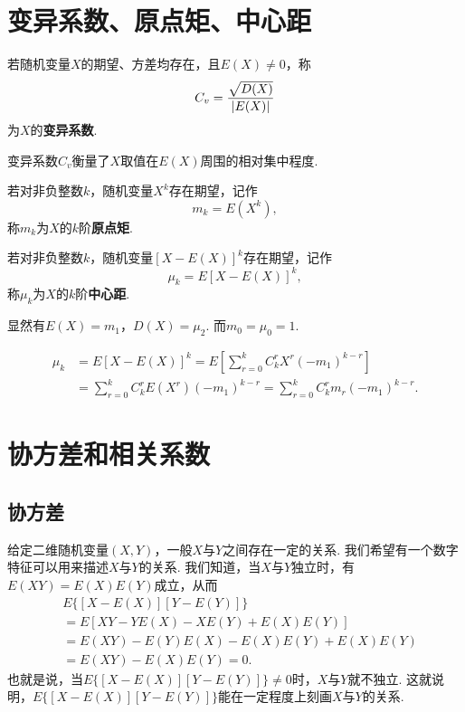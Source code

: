 \section{变异系数、原点矩、中心距}
\begin{definition}
若随机变量\(X\)的期望、方差均存在，且\(E(X) \neq 0\)，称\[
C_v = \frac{\sqrt{D(X)}}{\abs{E(X)}}
\]为\(X\)的\textbf{变异系数}.

变异系数\(C_v\)衡量了\(X\)取值在\(E(X)\)周围的相对集中程度.
\end{definition}

\begin{definition}
若对非负整数\(k\)，随机变量\(X^k\)存在期望，记作\[
m_k = E(X^k),
\]称\(m_k\)为\(X\)的\(k\)阶\textbf{原点矩}.

若对非负整数\(k\)，随机变量\([X-E(X)]^k\)存在期望，记作\[
\mu_k = E[X-E(X)]^k,
\]称\(\mu_k\)为\(X\)的\(k\)阶\textbf{中心距}.

显然有\(E(X) = m_1\)，\(D(X) = \mu_2\).
而\(m_0 = \mu_0 = 1\).
\end{definition}

\begin{theorem}
\begin{align*}
\mu_k &= E[X-E(X)]^k
= E\left[ \sum\limits_{r=0}^k{C_k^r X^r (-m_1)^{k-r}} \right] \\
&= \sum\limits_{r=0}^k{C_k^r E(X^r) (-m_1)^{k-r}}
= \sum\limits_{r=0}^k{C_k^r m_r (-m_1)^{k-r}}.
\end{align*}
\end{theorem}

\section{协方差和相关系数}
\subsection{协方差}
给定二维随机变量\((X,Y)\)，一般\(X\)与\(Y\)之间存在一定的关系.
我们希望有一个数字特征可以用来描述\(X\)与\(Y\)的关系.
我们知道，当\(X\)与\(Y\)独立时，有\(E(XY) = E(X) E(Y)\)成立，从而\begin{align*}
&E\bigl\{[X-E(X)][Y-E(Y)]\bigr\} \\
&= E[XY - Y E(X) - X E(Y) + E(X) E(Y)] \\
&= E(XY) - E(Y) E(X) - E(X) E(Y) + E(X) E(Y) \\
&= E(XY) - E(X) E(Y) = 0.
\end{align*}
也就是说，当\(E\bigl\{[X-E(X)][Y-E(Y)]\bigr\} \neq 0\)时，\(X\)与\(Y\)就不独立.
这就说明，\(E\bigl\{[X-E(X)][Y-E(Y)]\bigr\}\)能在一定程度上刻画\(X\)与\(Y\)的关系.

